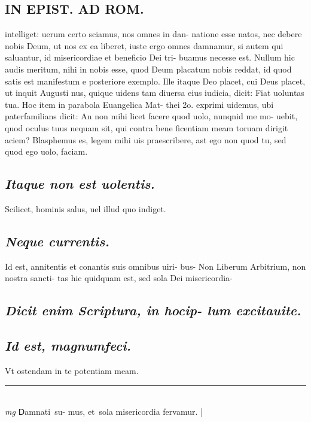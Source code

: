 \documentclass{article}
\begin{document}
\begin{pages}
\section*{IN EPIST. AD ROM.  }
\marginpar{[ p.112 ]}\pstart intelliget: uerum certo sciamus, nos omnes in dan- natione esse natos, nec debere nobis Deum, ut nos ex ea liberet, iuste ergo omnes damnamur, si autem qui saluantur, id misericordiae et beneficio Dei tri- buamus necesse est. Nullum hic audis meritum, nihi in nobis esse, quod Deum placatum nobis reddat, id quod satis est manifestum e posteriore exemplo. Ille itaque Deo placet, cui Deus placet, ut inquit Augusti nus, quique uidens tam diuersa eius iudicia, dicit: Fiat uoluntas tua. Hoc item in parabola Euangelica Mat- thei 2o. exprimi uidemus, ubi paterfamilians dicit: An non mihi licet facere quod uolo, nunqnid me mo- uebit, quod oculus tuus nequam sit, qui contra bene ficentiam meam toruam dirigit aciem? Blasphemus es, legem mihi uis praescribere, ast ego non quod tu, sed quod ego uolo, faciam.  \pend
{}
{}
\subsection*{\textit{Itaque non est uolentis. }}\pstart Scilicet, hominis salus, uel illud quo indiget.  \pend
{}
{}
\subsection*{\textit{Neque currentis. }}\pstart Id est, annitentis et conantis suis omnibus uiri- bus- Non Liberum Arbitrium, non nostra sancti- tas hic quidquam est, sed sola Dei misericordia-  \pend
{}
{}
\subsection*{\textit{Dicit enim Scriptura, in hocip- lum excitauite. }}
{}
\subsection*{\textit{Id est, magnumfeci.  }}\pstart Vt ostendam in te potentiam meam.  \pend
\vspace{0.5cm}\noindent
\vspace{0.2cm}\rule{1cm}{0.2pt}\\ 
\hspace{0.2cm}\textit{mg}
\footnotesize ᗞamnati su- mus, et sola misericordia fervamur.  
\normalsize| 

\end{pages}
\end{document}

